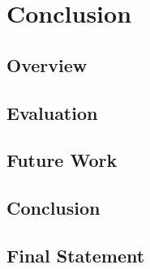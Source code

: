 \chapter{Conclusion}
\label{ch:conclusion}
\section{Overview}
\section{Evaluation}
\section{Future Work}
\section{Conclusion}
\section{Final Statement}